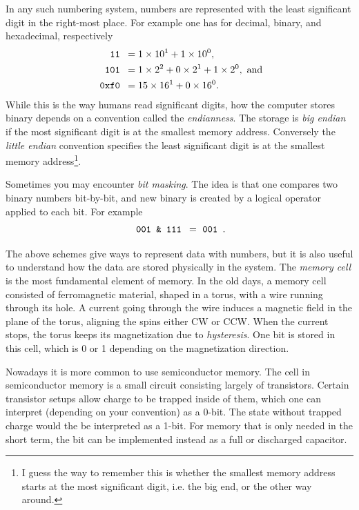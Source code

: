In any such numbering system, numbers are represented with the least significant
digit in the right-most place. For example one has for decimal, binary, and
hexadecimal, respectively
\begin{equation*}\begin{aligned}
  \ff{11} &= 1\times10^1+1\times10^0, \\
  \ff{101} &= 1\times2^2+0\times2^1+1\times2^0,~\text{and} \\
  \ff{0xf0} &= 15\times16^1+0\times16^0.
\end{aligned}\end{equation*}
While this is the way humans read significant digits, how the computer stores
binary depends on a convention called the {\it endianness}.
The storage is {\it big endian}  if the most significant digit 
is at the smallest memory address. Conversely the
{\it little endian}  convention specifies the least
significant digit is at the smallest memory address\footnote{I guess the way
to remember this is whether the smallest memory address starts at the most
significant digit, i.e. the big end, or the other way around.}.

Sometimes you may encounter {\it bit masking}. The idea is that one compares
two binary numbers bit-by-bit, and new binary is created by a logical operator
applied to each bit. For example
\begin{equation*}
  \ff{001 \& 111} = \ff{001}. 
\end{equation*}

The above schemes give ways to represent data with numbers, but it is also
useful to understand how the data are stored physically in the system.
The {\it memory cell} is the most fundamental element of memory. In the old
days, a memory cell consisted of ferromagnetic material, shaped in a torus, with
a wire running through its hole. A current going through the wire induces a
magnetic field in the plane of the torus, aligning the spins either CW or CCW.
When the current stops, the torus keeps its magnetization due to 
{\it hysteresis}. One bit is stored in this cell, which is 0
or 1 depending on the magnetization direction.

Nowadays it is more common to use semiconductor memory. The cell in
semiconductor memory is a small circuit consisting largely of transistors.
Certain transistor setups allow charge to be trapped inside of them,
which one can interpret (depending on your convention) as a 0-bit. The state
without trapped charge would the be interpreted as a 1-bit.
For memory that is only needed in the short term, the bit can be implemented 
instead as a full or discharged capacitor.


